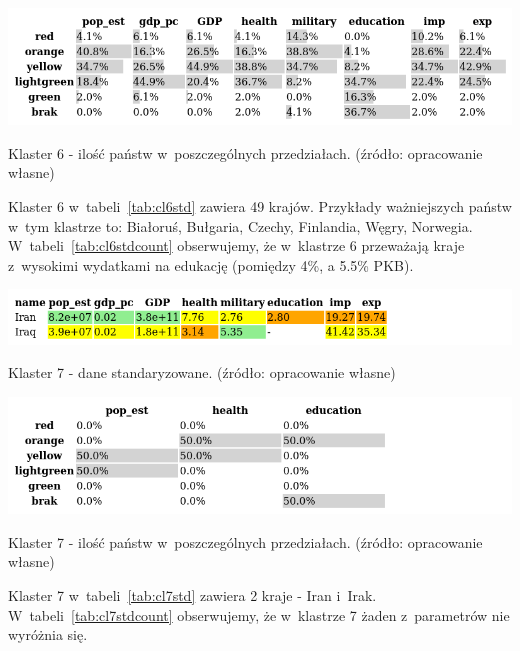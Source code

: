 \documentclass[11pt]{report}
\begin{document}
    \begin{table}[!htp]
        \centering
        \includegraphics[width=\linewidth]{tables/CLUST/cluster6stdkmeanscount.png}
        \caption{Klaster 6 - ilość państw w~poszczególnych przedziałach. (źródło: opracowanie własne)}
        \label{tab:cl6stdcount}
    \end{table}

    Klaster 6 w~tabeli~\ref{tab:cl6std} zawiera 49 krajów.
    Przykłady ważniejszych państw w~tym klastrze to: Białoruś, Bułgaria, Czechy, Finlandia, Węgry, Norwegia.
    W~tabeli~\ref{tab:cl6stdcount} obserwujemy, że w~klastrze 6 przeważają kraje z~wysokimi wydatkami na edukację (pomiędzy 4\%, a 5.5\% PKB).

    \begin{table}[!htp]
        \centering
        \includegraphics[width=\linewidth]{tables/CLUST/cluster7stdkmeans.png}
        \caption{Klaster 7 - dane standaryzowane. (źródło: opracowanie własne)}
        \label{tab:cl7std}
    \end{table}

    \begin{table}[!htp]
        \centering
        \includegraphics[width=\linewidth]{tables/CLUST/cluster7stdkmeanscount.png}
        \caption{Klaster 7 - ilość państw w~poszczególnych przedziałach. (źródło: opracowanie własne)}
        \label{tab:cl7stdcount}
    \end{table}

    Klaster 7 w~tabeli~\ref{tab:cl7std} zawiera 2 kraje - Iran i~Irak.
    W~tabeli~\ref{tab:cl7stdcount} obserwujemy, że w~klastrze 7 żaden z~parametrów nie wyróżnia się.
\end{document}
